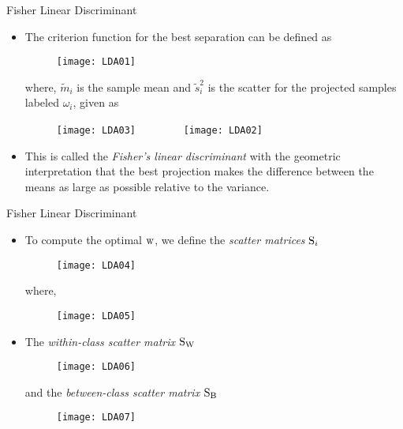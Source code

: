 \begin{frame}{Fisher Linear Discriminant}
\begin{itemize}
\item The criterion function for the best separation can be defined as
\begin{figure}
\texttt{[image: LDA01]}
\end{figure}
where, $\tilde{m}_i$ is the sample mean and $\tilde{s}_i^2$ is the scatter for the projected samples labeled $\omega_i$, given as
\begin{figure}
\texttt{[image: LDA03]}~~~~~~~~
\texttt{[image: LDA02]}
\end{figure}
\item This is called the \textit{\color{mycolor2}Fisher's linear discriminant} with the
geometric interpretation that the best projection makes the
difference between the means as large as possible relative
to the variance.
\end{itemize}
\end{frame}

\begin{frame}{Fisher Linear Discriminant}
\begin{itemize}
\item To compute the optimal ${\rm w}$, we define the \textit{\color{mycolor2}scatter matrices} ${\rm S}_i$
\begin{figure}
\texttt{[image: LDA04]}
\end{figure}
where,
\begin{figure}
\texttt{[image: LDA05]}
\end{figure}
\item The \textit{\color{mycolor2}within-class scatter matrix} ${\rm S_ W}$
\begin{figure}
\texttt{[image: LDA06]}
\end{figure}
and the \textit{\color{mycolor2}between-class scatter matrix} ${\rm S_B}$
\begin{figure}
\texttt{[image: LDA07]}
\end{figure}
\end{itemize}
\end{frame}


